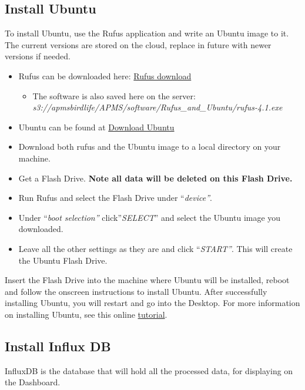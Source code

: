 \documentclass[
  letterpaper,
]{scrbook}
\providecommand{\tightlist}{%
  \setlength{\itemsep}{0pt}\setlength{\parskip}{0pt}}
\begin{document}
\subsection{Install Ubuntu}\label{install-ubuntu}

To install Ubuntu, use the Rufus application and write an Ubuntu image
to it. The current versions are stored on the cloud, replace in future
with newer versions if needed.

\begin{itemize}
\item
  Rufus can be downloaded here: \href{https://rufus.ie/en/}{Rufus
  download}

  \begin{itemize}
  \tightlist
  \item
    The software is also saved here on the server:
    \emph{s3://apmsbirdlife/APMS/software/Rufus\_and\_Ubuntu/rufus-4.1.exe}
  \end{itemize}
\item
  Ubuntu can be found at
  \href{https://ubuntu.com/download/desktop}{Download Ubuntu}
\item
  Download both rufus and the Ubuntu image to a local directory on your
  machine.
\item
  Get a Flash Drive. \textbf{Note all data will be deleted on this Flash
  Drive.}
\item
  Run Rufus and select the Flash Drive under ``\emph{device''}.
\item
  Under ``\emph{boot selection''} click''\emph{SELECT}'' and select the
  Ubuntu image you downloaded.
\item
  Leave all the other settings as they are and click ``\emph{START''}.
  This will create the Ubuntu Flash Drive.
\end{itemize}

Insert the Flash Drive into the machine where Ubuntu will be installed,
reboot and follow the onscreen instructions to install Ubuntu. After
successfully installing Ubuntu, you will restart and go into the
Desktop. For more information on installing Ubuntu, see this online
\href{https://ubuntu.com/tutorials/install-ubuntu-desktop\#1-overview}{tutorial}.

\subsection{Install Influx DB}\label{install-influx-db}

InfluxDB is the database that will hold all the processed data, for
displaying on the Dashboard.
\end{document}
